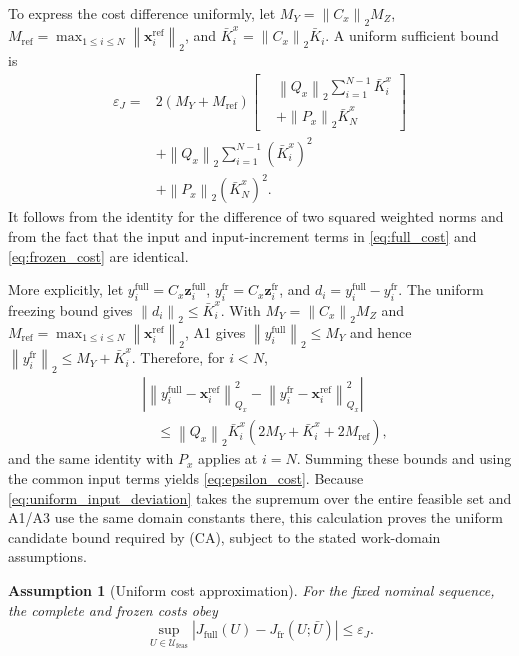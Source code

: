 \documentclass[journal]{IEEEtran}
\newtheorem{assumption}{Assumption}
\newcommand{\vx}{\mathbf{x}}
\newcommand{\vz}{\mathbf{z}}
\newcommand{\norm}[1]{\left\lVert #1\right\rVert}
\begin{document}
To express the cost difference uniformly, let $M_Y=\norm{C_x}_2M_Z$, $M_{\mathrm{ref}}=\max_{1\le i\le N}\norm{\vx_i^{\mathrm{ref}}}_2$, and $\bar K_i^x=\norm{C_x}_2\bar K_i$. A uniform sufficient bound is
\begin{equation}
\begin{aligned}
\varepsilon_J={}&2(M_Y+M_{\mathrm{ref}})
 \left[\begin{aligned}
 &\norm{Q_x}_2\sum_{i=1}^{N-1}\bar K_i^x\\
 &+\norm{P_x}_2\bar K_N^x
 \end{aligned}\right]\\
&+\norm{Q_x}_2\sum_{i=1}^{N-1}(\bar K_i^x)^2\\
&+\norm{P_x}_2(\bar K_N^x)^2.
\end{aligned}
\label{eq:epsilon_cost}
\end{equation}
It follows from the identity for the difference of two squared weighted norms and from the fact that the input and input-increment terms in \eqref{eq:full_cost} and \eqref{eq:frozen_cost} are identical.

More explicitly, let $y_i^{\mathrm{full}}=C_x\vz_i^{\mathrm{full}}$, $y_i^{\mathrm{fr}}=C_x\vz_i^{\mathrm{fr}}$, and $d_i=y_i^{\mathrm{full}}-y_i^{\mathrm{fr}}$. The uniform freezing bound gives $\norm{d_i}_2\le\bar K_i^x$. With $M_Y=\norm{C_x}_2M_Z$ and $M_{\mathrm{ref}}=\max_{1\le i\le N}\norm{\vx_i^{\mathrm{ref}}}_2$, A1 gives $\norm{y_i^{\mathrm{full}}}_2\le M_Y$ and hence $\norm{y_i^{\mathrm{fr}}}_2\le M_Y+\bar K_i^x$. Therefore, for $i<N$,
\begin{equation}
\begin{aligned}
&\left|\norm{y_i^{\mathrm{full}}-\vx_i^{\mathrm{ref}}}_{Q_x}^2-
\norm{y_i^{\mathrm{fr}}-\vx_i^{\mathrm{ref}}}_{Q_x}^2\right|\\
&\quad\le\norm{Q_x}_2\bar K_i^x(2M_Y+\bar K_i^x+2M_{\mathrm{ref}}),
\end{aligned}
\end{equation}
and the same identity with $P_x$ applies at $i=N$. Summing these bounds and using the common input terms yields \eqref{eq:epsilon_cost}. Because \eqref{eq:uniform_input_deviation} takes the supremum over the entire feasible set and A1/A3 use the same domain constants there, this calculation proves the uniform candidate bound required by (CA), subject to the stated work-domain assumptions.

\begin{assumption}[Uniform cost approximation]
\label{ass:cost_approximation}
For the fixed nominal sequence, the complete and frozen costs obey
\begin{equation}
    \sup_{U\in\mathcal U_{\mathrm{feas}}}
    |J_{\mathrm{full}}(U)-J_{\mathrm{fr}}(U;\bar U)|\le\varepsilon_J.
\end{equation}
\end{assumption}
\end{document}
